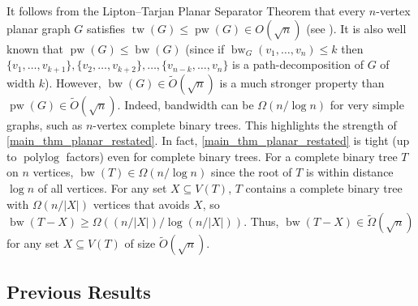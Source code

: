 \documentclass{patmorin}
\renewcommand{\ge}{\geqslant}
\renewcommand{\geq}{\geqslant}
\renewcommand{\leq}{\leqslant}
\DeclareMathOperator{\tw}{tw}
\DeclareMathOperator{\pw}{pw}
\DeclareMathOperator{\bw}{bw}
\DeclareMathOperator{\polylog}{polylog}
\newcommand{\NN}{\mathbb{N}}
\begin{document}
It follows from the Lipton--Tarjan Planar Separator Theorem that every $n$-vertex planar graph $G$ satisfies $\tw(G)\leq \pw(G)\in O(\sqrt{n})$ (see \citep{Bodlaender98}). It is also well known that $\pw(G)\leq \bw(G)$ (since if $\bw_G(v_1,\dots,v_n)\leq k$ then $\{v_1,\dots,v_{k+1}\},\{v_2,\dots,v_{k+2}\},\dots,\{v_{n-k},\dots,v_n\}$ is a path-decomposition of $G$ of width $k$). However, $\bw(G)\in \tilde{O}(\sqrt{n})$ is a much stronger property than $\pw(G)\in \tilde{O}(\sqrt{n})$. Indeed, bandwidth can be $\Omega(n / \log n)$ 
for very simple graphs, such as $n$-vertex complete binary trees. This highlights the strength of \cref{main_thm_planar_restated}. In fact, \cref{main_thm_planar_restated} is tight (up to $\polylog$ factors) even for complete binary trees. For a complete binary tree $T$ on $n$ vertices, $\bw(T)\in \Omega(n/\log n)$ since the root of $T$ is within distance $\log n$ of all vertices.  For any set $X\subseteq V(T)$, $T$ contains a complete binary tree with $\Omega(n/|X|)$ vertices that avoids $X$, so $\bw(T-X)\ge\Omega((n/|X|) / \log(n/|X|))$.  Thus, $\bw(T-X)\in\tilde{\Omega}(\sqrt{n})$ for any set $X\subseteq V(T)$ of size $\tilde{O}(\sqrt{n})$.  


\subsection{Previous Results}
\label{Previous}
\end{document}
